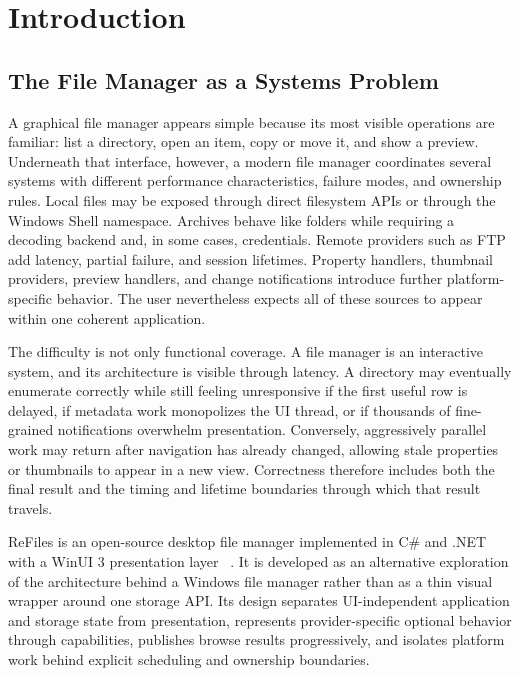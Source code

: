 \documentclass[10pt,a4paper,twoside]{article}
\begin{document}
\vspace{3mm}

\section{Introduction}
\label{section:introduction}

\subsection{The File Manager as a Systems Problem}

A graphical file manager appears simple because its most visible operations are familiar: list a directory,
open an item, copy or move it, and show a preview. Underneath that interface, however, a modern file manager
coordinates several systems with different performance characteristics, failure modes, and ownership rules.
Local files may be exposed through direct filesystem APIs or through the Windows Shell namespace. Archives
behave like folders while requiring a decoding backend and, in some cases, credentials. Remote providers such
as FTP add latency, partial failure, and session lifetimes. Property handlers, thumbnail providers, preview
handlers, and change notifications introduce further platform-specific behavior. The user nevertheless expects
all of these sources to appear within one coherent application.

The difficulty is not only functional coverage. A file manager is an interactive system, and its architecture
is visible through latency. A directory may eventually enumerate correctly while still feeling unresponsive if
the first useful row is delayed, if metadata work monopolizes the UI thread, or if thousands of fine-grained
notifications overwhelm presentation. Conversely, aggressively parallel work may return after navigation has
already changed, allowing stale properties or thumbnails to appear in a new view. Correctness therefore includes
both the final result and the timing and lifetime boundaries through which that result travels.

ReFiles is an open-source desktop file manager implemented in C\# and .NET with a WinUI 3 presentation layer
~\cite{refiles-repository}.
It is developed as an alternative exploration of the architecture behind a Windows file manager rather than as
a thin visual wrapper around one storage API. Its design separates UI-independent application and storage state
from presentation, represents provider-specific optional behavior through capabilities, publishes browse results
progressively, and isolates platform work behind explicit scheduling and ownership boundaries.
\end{document}
